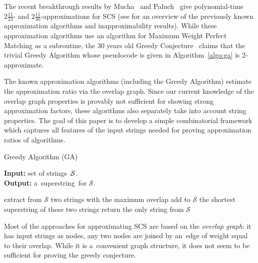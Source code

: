 \documentclass[11pt]{article}
\begin{document}
The recent breakthrough results by Mucha~\cite{M2013} and Paluch~\cite{P14} give polynomial-time $2\frac{11}{23}$- and $2\frac{11}{30}$-approximations for SCS (see \cite[Section~2.1]{GKM13} for an overview of the 
previously known approximation algorithms
and inapproximability results). While these approximation algorithms use an algorithm for Maximum Weight Perfect Matching as a subroutine, the $30$ years old Greedy Conjecture~\cite{storer1987data, TU1988, T1989, BJLTY1991} claims that the trivial Greedy Algorithm whose pseudocode is given in Algorithm~\ref{algo:ga} is 2-approximate.



The known approximation algorithms (including the Greedy Algorithm) estimate the approximation ratio via the overlap graph. Since our current knowledge of the overlap graph properties is provably not sufficient for showing strong approximation factors, these algorithms also separately take into account string properties. The goal of this paper is to develop a simple combinatorial framework which captures all features of the input strings needed for proving approximation ratios of algorithms.


\begin{algorithm}[ht]
\label{algo:ga}
\caption{Greedy Algorithm (GA)}
\hspace*{\algorithmicindent} \textbf{Input:} set of strings~${\cal S}$.\\
\hspace*{\algorithmicindent} \textbf{Output:} a~superstring~for $\mathcal{S}$.
\begin{algorithmic}[1]
\State extract from $\mathcal{S}$ two strings with the maximum overlap
\State add to $\mathcal{S}$ the shortest superstring of these two strings
\EndWhile
\State return the only string from $\mathcal{S}$
\end{algorithmic}
\end{algorithm}




Most of the approaches for approximating SCS are based on the
{\em overlap graph}: it has input strings as nodes, any two nodes 
are joined by an~edge of weight equal to their overlap.  
While it is a~convenient graph structure, it does not seem to be sufficient
for proving the greedy conjecture.
\end{document}
